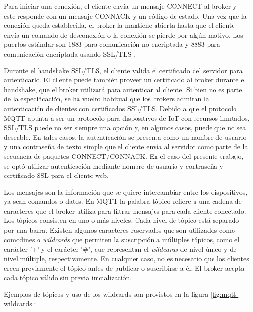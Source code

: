 Para iniciar una conexión, el cliente envía un mensaje CONNECT al broker y este responde con un mensaje CONNACK y un código de estado. Una vez que la conexión queda establecida, el broker la mantiene abierta hasta que el cliente envía un comando de desconexión o la conexión se pierde por algún motivo. Los puertos estándar son 1883 para comunicación no encriptada y 8883 para comunicación encriptada usando SSL/TLS \citep{WEBSITE:17}.

Durante el handshake SSL/TLS, el cliente valida el certificado del servidor para autenticarlo. El cliente puede también proveer un certificado al broker durante el handshake, que el broker utilizará para autenticar al cliente. Si bien no es parte de la especificación, se ha vuelto habitual que los brokers admitan la autenticación de clientes con certificados SSL/TLS. Debido a que el protocolo MQTT apunta a ser un protocolo para dispositivos de IoT con recursos limitados, SSL/TLS puede no ser siempre una opción y, en algunos casos, puede que no sea deseable. En tales casos, la autenticación se presenta como un nombre de usuario y una contraseña de texto simple que el cliente envía al servidor como parte de la secuencia de paquetes CONNECT/CONNACK.  En el caso del presente trabajo, se optó utilizar autenticación mediante nombre de usuario y contraseña y certificado SSL para el cliente web.

Los mensajes son la información que se quiere intercambiar entre los dispositivos, ya sean comandos o datos. En MQTT la palabra tópico refiere a una cadena de caracteres que el broker utiliza para filtrar mensajes para cada cliente conectado. Los tópicos consisten en uno o más niveles. Cada nivel de tópico está separado por una barra. Existen algunos caracteres reservados que son utilizados como comodines o \textit{wildcards} que permiten la suscripción a múltiples tópicos, como el carácter '+' y el carácter '\#', que representan el  \textit{wildcards} de nivel único y de nivel múltiple, respectivamente. En cualquier caso, no es necesario que los clientes creen previamente el tópico antes de publicar o suscribirse a él. El broker acepta cada tópico válido sin previa inicialización.

Ejemplos de tópicos y uso de los wildcards son provistos en la figura \ref{fig:mqtt-wildcards}:


